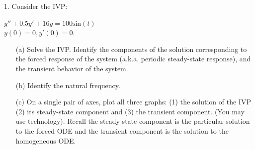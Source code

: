 \documentclass[12pt,letterpaper]{hmcpset}
\begin{document}
\begin{problem}
1. Consider the IVP:
\begin{center}
    $y'' + 0.5y' + 16y = 100 \text{sin} (t)$\\
    $y(0) = 0, y'(0) = 0$.
\end{center}
\begin{enumerate}
    \item[(a)] Solve the IVP. Identify the components of the solution corresponding to the forced response
of the system (a.k.a. periodic steady-state response), and the transient behavior
of the system.
    \item[(b)] Identify the natural frequency.
    \item[(c)] On a single pair of axes, plot all three graphs: (1) the solution of the IVP (2) its
steady-state component and (3) the transient component. (You may use technology).
Recall the steady state component is the particular solution to the forced ODE and the
transient component is the solution to the homogeneous ODE.
\end{enumerate}

\end{problem}
\newpage
\end{document}
